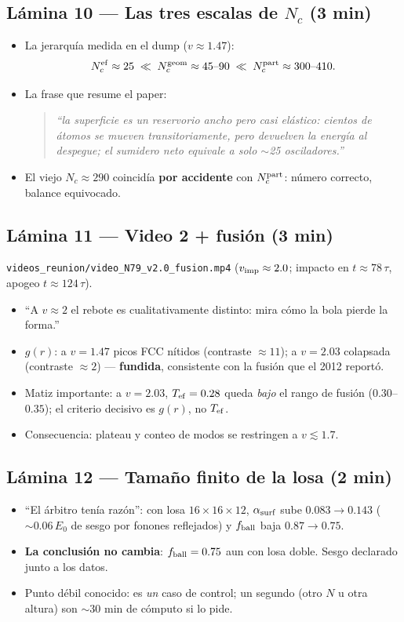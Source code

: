 \documentclass[11pt]{article}
\newcommand{\clave}[1]{\textcolor{red!60!black}{\textbf{#1}}}
\newcommand{\decir}[1]{\begin{quote}\itshape``#1''\end{quote}}
\begin{document}
\subsection*{Lámina 10 --- Las tres escalas de $N_c$ (3 min)}
\begin{itemize}[leftmargin=1.4em]
    \item La jerarquía medida en el dump ($v\approx1.47$):
    \[ N_c^{\rm ef}\approx25 \;\ll\; N_c^{\rm geom}\approx45\text{--}90
       \;\ll\; N_c^{\rm part}\approx300\text{--}410. \]
    \item La frase que resume el paper: \decir{la superficie es un
    reservorio ancho pero casi elástico: cientos de átomos se mueven
    transitoriamente, pero devuelven la energía al despegue; el sumidero
    neto equivale a solo $\sim$25 osciladores.}
    \item El viejo $N_c\approx290$ coincidía \clave{por accidente} con
    $N_c^{\rm part}$: número correcto, balance equivocado.
\end{itemize}

\subsection*{Lámina 11 --- Video 2 + fusión (3 min)}
\texttt{videos\_reunion/video\_N79\_v2.0\_fusion.mp4} ($v_{\rm imp}
\approx2.0$; impacto en $t\approx78\,\tau$, apogeo $t\approx124\,\tau$).
\begin{itemize}[leftmargin=1.4em]
    \item ``A $v\approx2$ el rebote es cualitativamente distinto: mira
    cómo la bola pierde la forma.''
    \item $g(r)$: a $v=1.47$ picos FCC nítidos (contraste $\approx11$);
    a $v=2.03$ colapsada (contraste $\approx2$) --- \clave{fundida},
    consistente con la fusión que el 2012 reportó.
    \item Matiz importante: a $v=2.03$, $T_{\rm ef}=0.28$ queda
    \emph{bajo} el rango de fusión ($0.30$--$0.35$); el criterio decisivo
    es $g(r)$, no $T_{\rm ef}$.
    \item Consecuencia: plateau y conteo de modos se restringen a
    $v\lesssim1.7$.
\end{itemize}

\subsection*{Lámina 12 --- Tamaño finito de la losa (2 min)}
\begin{itemize}[leftmargin=1.4em]
    \item ``El árbitro tenía razón'': con losa $16\times16\times12$,
    $\alpha_{\rm surf}$ sube $0.083\to0.143$ ($\sim0.06\,E_0$ de sesgo
    por fonones reflejados) y $f_{\rm ball}$ baja $0.87\to0.75$.
    \item \clave{La conclusión no cambia}: $f_{\rm ball}=0.75$ aun con
    losa doble. Sesgo declarado junto a los datos.
    \item Punto débil conocido: es \emph{un} caso de control; un segundo
    (otro $N$ u otra altura) son $\sim$30 min de cómputo si lo pide.
\end{itemize}
\end{document}
